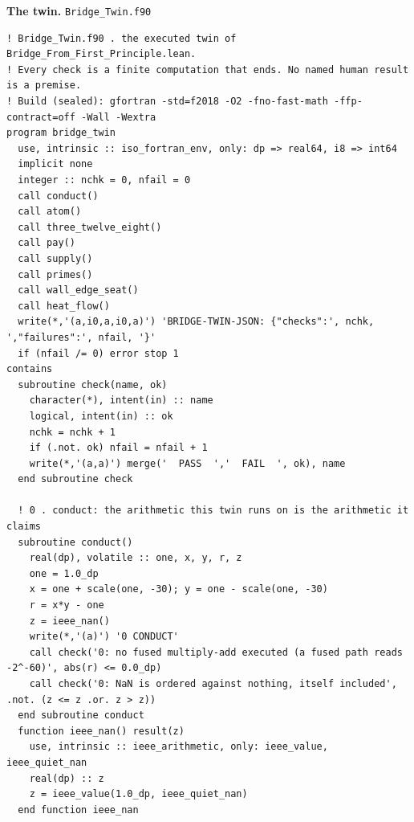 \documentclass[10pt,twocolumn]{article}
\begin{document}
\textbf{The twin.} \texttt{Bridge\_\allowbreak{}Twin.f90}

\begin{Verbatim}
! Bridge_Twin.f90 . the executed twin of Bridge_From_First_Principle.lean.
! Every check is a finite computation that ends. No named human result is a premise.
! Build (sealed): gfortran -std=f2018 -O2 -fno-fast-math -ffp-contract=off -Wall -Wextra
program bridge_twin
  use, intrinsic :: iso_fortran_env, only: dp => real64, i8 => int64
  implicit none
  integer :: nchk = 0, nfail = 0
  call conduct()
  call atom()
  call three_twelve_eight()
  call pay()
  call supply()
  call primes()
  call wall_edge_seat()
  call heat_flow()
  write(*,'(a,i0,a,i0,a)') 'BRIDGE-TWIN-JSON: {"checks":', nchk, ',"failures":', nfail, '}'
  if (nfail /= 0) error stop 1
contains
  subroutine check(name, ok)
    character(*), intent(in) :: name
    logical, intent(in) :: ok
    nchk = nchk + 1
    if (.not. ok) nfail = nfail + 1
    write(*,'(a,a)') merge('  PASS  ','  FAIL  ', ok), name
  end subroutine check

  ! 0 . conduct: the arithmetic this twin runs on is the arithmetic it claims
  subroutine conduct()
    real(dp), volatile :: one, x, y, r, z
    one = 1.0_dp
    x = one + scale(one, -30); y = one - scale(one, -30)
    r = x*y - one
    z = ieee_nan()
    write(*,'(a)') '0 CONDUCT'
    call check('0: no fused multiply-add executed (a fused path reads -2^-60)', abs(r) <= 0.0_dp)
    call check('0: NaN is ordered against nothing, itself included', .not. (z <= z .or. z > z))
  end subroutine conduct
  function ieee_nan() result(z)
    use, intrinsic :: ieee_arithmetic, only: ieee_value, ieee_quiet_nan
    real(dp) :: z
    z = ieee_value(1.0_dp, ieee_quiet_nan)
  end function ieee_nan


\end{Verbatim}
\end{document}
